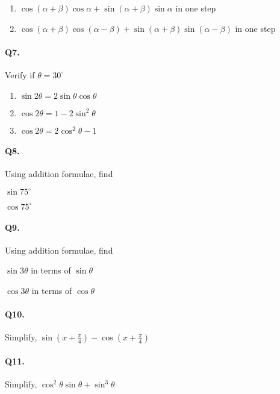 \documentclass{article}
\begin{document}
\begin{enumerate}[label=\roman*)]
  \item $\cos(\alpha+\beta)\cos\alpha + \sin(\alpha+\beta)\sin\alpha$ in one step
  \item $\cos(\alpha+\beta)\cos(\alpha-\beta) + \sin(\alpha+\beta)\sin(\alpha-\beta)$ in one step
\end{enumerate}

\paragraph{Q7.}
Verify if $\theta = 30^{\circ}$

\begin{enumerate}[label=]
  \item $\sin 2\theta = 2\sin\theta\cos\theta$
  \item $\cos 2\theta = 1 - 2\sin^{2}\theta$
  \item $\cos 2\theta = 2\cos^{2}\theta - 1$
\end{enumerate}

\paragraph{Q8.}
Using addition formulae, find

\begin{enumerate*}[label=(\alph*)]
  \item $\sin 75^{\circ}$
  \item $\cos 75^{\circ}$
\end{enumerate*}

\paragraph{Q9.}
Using addition formulae, find

\begin{enumerate*}[label=(\alph*)]
  \item $\sin 3\theta$ in terms of $\sin \theta$
  \item $\cos 3\theta$ in terms of $\cos \theta$
\end{enumerate*}

\paragraph{Q10.}
Simplify, $\sin \left( x + \frac{\pi}{4} \right) - \cos \left( x + \frac{\pi}{4} \right)$

\paragraph{Q11.}
Simplify, $\cos^{2}\theta \sin\theta + \sin^{3}\theta$
\end{document}

